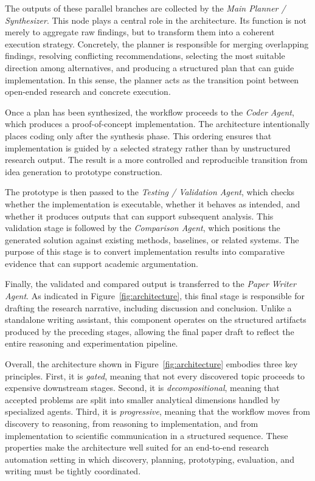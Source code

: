 \documentclass[11pt,a4paper]{article}
\begin{document}
The outputs of these parallel branches are collected by the \emph{Main Planner / Synthesizer}. This node plays a central role in the architecture. Its function is not merely to aggregate raw findings, but to transform them into a coherent execution strategy. Concretely, the planner is responsible for merging overlapping findings, resolving conflicting recommendations, selecting the most suitable direction among alternatives, and producing a structured plan that can guide implementation. In this sense, the planner acts as the transition point between open-ended research and concrete execution.

Once a plan has been synthesized, the workflow proceeds to the \emph{Coder Agent}, which produces a proof-of-concept implementation. The architecture intentionally places coding only after the synthesis phase. This ordering ensures that implementation is guided by a selected strategy rather than by unstructured research output. The result is a more controlled and reproducible transition from idea generation to prototype construction.

The prototype is then passed to the \emph{Testing / Validation Agent}, which checks whether the implementation is executable, whether it behaves as intended, and whether it produces outputs that can support subsequent analysis. This validation stage is followed by the \emph{Comparison Agent}, which positions the generated solution against existing methods, baselines, or related systems. The purpose of this stage is to convert implementation results into comparative evidence that can support academic argumentation.

Finally, the validated and compared output is transferred to the \emph{Paper Writer Agent}. As indicated in Figure~\ref{fig:architecture}, this final stage is responsible for drafting the research narrative, including discussion and conclusion. Unlike a standalone writing assistant, this component operates on the structured artifacts produced by the preceding stages, allowing the final paper draft to reflect the entire reasoning and experimentation pipeline.

Overall, the architecture shown in Figure~\ref{fig:architecture} embodies three key principles. First, it is \emph{gated}, meaning that not every discovered topic proceeds to expensive downstream stages. Second, it is \emph{decompositional}, meaning that accepted problems are split into smaller analytical dimensions handled by specialized agents. Third, it is \emph{progressive}, meaning that the workflow moves from discovery to reasoning, from reasoning to implementation, and from implementation to scientific communication in a structured sequence. These properties make the architecture well suited for an end-to-end research automation setting in which discovery, planning, prototyping, evaluation, and writing must be tightly coordinated.
\end{document}
